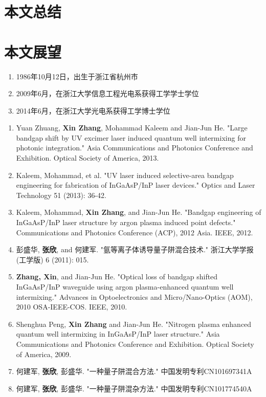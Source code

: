 \documentclass[oneside]{ZJUthesis}
\begin{document}
\section{本文总结}

\section{本文展望}

\ZJUbackmatter



\begin{resume}
\begin{enumerate}
\item{1986年10月12日，出生于浙江省杭州市}
\item{2009年6月，在浙江大学信息工程光电系获得工学学士学位}
\item{2014年6月，在浙江大学光电系获得工学博士学位}
\end{enumerate}
\end{resume}

\begin{publications}
\begin{enumerate}
\item{Yuan Zhuang, \textbf{Xin Zhang}, Mohammad Kaleem and Jian-Jun He. "Large bandgap shift by UV excimer laser induced quantum well intermixing for photonic integration." Asia Communications and Photonics Conference and Exhibition. Optical Society of America, 2013.}
\item{Kaleem, Mohammad, et al. "UV laser induced selective-area bandgap engineering for fabrication of InGaAsP/InP laser devices." Optics and Laser Technology 51 (2013): 36-42.}
\item{Kaleem, Mohammad, \textbf{Xin Zhang}, and Jian-Jun He. "Bandgap engineering of InGaAsP/InP laser structure by argon plasma induced point defects." Communications and Photonics Conference (ACP), 2012 Asia. IEEE, 2012.}
\item{彭盛华, \textbf{张欣}, and 何建军. "氩等离子体诱导量子阱混合技术." 浙江大学学报 (工学版) 6 (2011): 015.}
\item{\textbf{Zhang, Xin}, and Jian-Jun He. "Optical loss of bandgap shifted InGaAsP/InP waveguide using argon plasma-enhanced quantum well intermixing." Advances in Optoelectronics and Micro/Nano-Optics (AOM), 2010 OSA-IEEE-COS. IEEE, 2010.}
\item{Shenghua Peng, \textbf{Xin Zhang} and Jian-Jun He. "Nitrogen plasma enhanced quantum well intermixing in InGaAsP/InP laser structure." Asia Communications and Photonics Conference and Exhibition. Optical Society of America, 2009.}
\item{何建军, \textbf{张欣}, 彭盛华. "一种量子阱混合方法." 中国发明专利CN101697341A}
\item{何建军, \textbf{张欣}, 彭盛华. "一种量子阱混杂方法." 中国发明专利CN101774540A}
\end{enumerate}
\end{publications}
\end{document}
